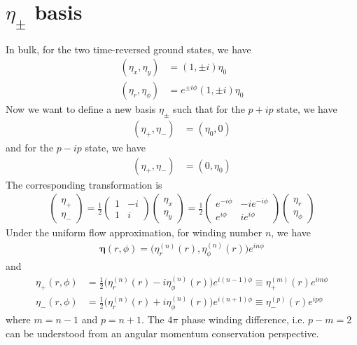 \documentclass[aps,prl,preprint]{revtex4-2}
\begin{document}
\section{$\eta_\pm$ basis}

In bulk, for the two time-reversed ground states, we have
\begin{align}
    (\eta_x, \eta_y)    & = (1, \pm i)\eta_0              \\
    (\eta_r, \eta_\phi) & = e^{\pm i\phi}(1, \pm i)\eta_0
\end{align}
Now we want to define a new basis $\eta_\pm$ such that for the $p+ip$ state, we have
\begin{align}
    (\eta_+, \eta_-) & = (\eta_0, 0)
\end{align}
and for the $p-ip$ state, we have
\begin{align}
    (\eta_+, \eta_-) & = (0, \eta_0)
\end{align}
The corresponding transformation is
\begin{align}
    \begin{pmatrix}
        \eta_+ \\
        \eta_-
    \end{pmatrix}
    = \frac{1}{2}
    \begin{pmatrix}
        1 & -i \\
        1 & i
    \end{pmatrix}
    \begin{pmatrix}
        \eta_x \\
        \eta_y
    \end{pmatrix}
    = \frac{1}{2}
    \begin{pmatrix}
        e^{-i\phi} & -ie^{-i\phi} \\
        e^{i\phi}  & ie^{i\phi}
    \end{pmatrix}
    \begin{pmatrix}
        \eta_r \\
        \eta_\phi
    \end{pmatrix}
\end{align}
Under the uniform flow approximation, for winding number $n$, we have
\begin{align}
    \bm{\eta}(r, \phi) = \bigg(\eta_r^{(n)}(r), \eta_\phi^{(n)}(r)\bigg) e^{in\phi}
\end{align}
and
\begin{align}
    \eta_+(r,\phi)
     & = \frac{1}{2}\bigg(\eta_r^{(n)}(r) - i\eta_\phi^{(n)}(r)\bigg)e^{i(n-1)\phi}
    \equiv \eta_+^{(m)}(r)e^{im\phi}                                                \\
    \eta_-(r,\phi)
     & = \frac{1}{2}\bigg(\eta_r^{(n)}(r) + i\eta_\phi^{(n)}(r)\bigg)e^{i(n+1)\phi}
    \equiv \eta_-^{(p)}(r)e^{ip\phi}
\end{align}
where $m=n-1$ and $p=n+1$. The $4\pi$ phase winding difference, i.e. $p-m=2$
can be understood from an angular momentum conservation perspective.
\end{document}
